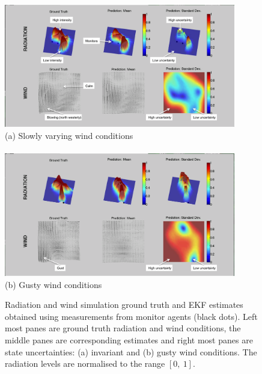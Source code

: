 \begin{figure}[ht] \begin{center}
    \includegraphics[width=0.90\textwidth]{figures/radiation_ss_calm_annotated.png}\\
    (a) Slowly varying wind conditions\\ \ \\
    \includegraphics[width=0.90\textwidth]{figures/radiation_ss_gust_annotated.png}\\
    (b) Gusty wind conditions 
\caption{\label{radiation_screen_shots} Radiation and wind simulation ground truth and EKF estimates obtained using measurements from monitor agents (black dots).  Left most panes are ground truth radiation and wind conditions, the middle panes are corresponding estimates and right most panes are state uncertainties:  (a) invariant and (b) gusty wind conditions.  The radiation levels are normalised to the range $[0,\ 1]$.}
\end{center}
\end{figure}
